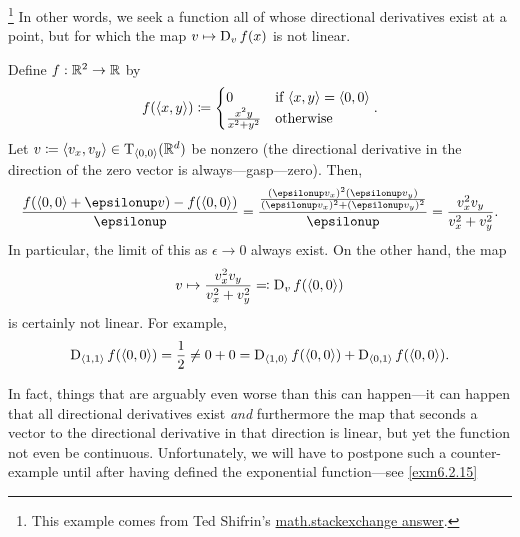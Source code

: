 \begin{exm}\footnote{This example comes from Ted Shifrin's \href{http://math.stackexchange.com/questions/694486/show-that-the-directional-derivative-is-linear-by-definition}{math.stackexchange answer}.}
In other words, we seek a function all of whose directional derivatives exist at a point, but for which the map $v\mapsto \D _vf(x)$ is not linear.

Define $f:\R ^2\rightarrow \R$ by
\begin{equation}
f(\coord{x,y})\coloneqq \begin{cases}0 & \text{if }\coord{x,y}=\coord{0,0} \\ \frac{x^2y}{x^2+y^2} & \text{otherwise}\end{cases}.
\end{equation}
Let $v\coloneqq \coord{v_x,v_y}\in \tangent{\R ^d}{\coord{0,0}}$ be nonzero (the directional derivative in the direction of the zero vector is always---gasp---zero).  Then,
\begin{equation}
\frac{f(\coord{0,0}+\epsilon v)-f(\coord{0,0})}{\epsilon}=\frac{\frac{(\epsilon v_x)^2(\epsilon v_y)}{(\epsilon v_x)^2+(\epsilon v_y)^2}}{\epsilon}=\frac{v_x^2v_y}{v_x^2+v_y^2}.
\end{equation}
In particular, the limit of this as $\epsilon \to 0$ always exist.  On the other hand, the map
\begin{equation}
v\mapsto \frac{v_x^2v_y}{v_x^2+v_y^2}\eqqcolon \D _vf(\coord{0,0})
\end{equation}
is certainly not linear.  For example,
\begin{equation}
\D _{\coord{1,1}}f(\coord{0,0})=\frac{1}{2}\neq 0+0=\D _{\coord{1,0}}f(\coord{0,0})+\D _{\coord{0,1}}f(\coord{0,0}).
\end{equation}
\end{exm}
In fact, things that are arguably even worse than this can happen---it can happen that all directional derivatives exist \emph{and} furthermore the map that seconds a vector to the directional derivative in that direction is linear, but yet the function not even be continuous.  Unfortunately, we will have to postpone such a counter-example until after having defined the exponential function---see \cref{exm6.2.15}

